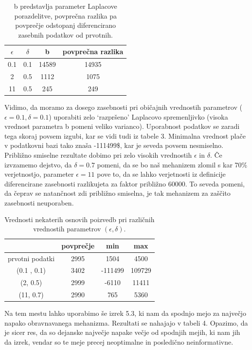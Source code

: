 \documentclass[12pt,a4paper]{amsart}
\theoremstyle{definition} %
\theoremstyle{plain} %
\begin{document}
\begin{table}[h]
\begin{center}
 \begin{tabular}{| c | c | c | c |} 
 \hline
 \textbf{$\epsilon$} & \textbf{$\delta$} & b & povprečna razlika  \\ [0.5ex] 
 \hline
 0.1 & 0.1 & 14589 & 14935  \\ 
 \hline
 2 & 0.5 & 1112 & 1075\\
 \hline
 11 & 0.5 & 245 & 249 \\
 \hline
\end{tabular}
\caption{b predstavlja parameter Laplacove porazdelitve, povprečna razlika pa povprečje odstopanj diferencirano zasebnih podatkov od prvotnih. }
\end{center}
\end{table}
Vidimo, da moramo za dosego zasebnosti pri običajnih vrednostih parametrov ($\epsilon = 0.1, \delta = 0.1$) uporabiti zelo `razpršeno' Laplacovo spremenljivko (visoka vrednost parametra b pomeni veliko varianco). Uporabnost podatkov se zaradi tega skoraj povsem izgubi, kar se vidi tudi iz tabele 3. Minimalna vrednost plače v podatkovni bazi tako znaša -111499\$, kar je seveda povsem nesmiselno. Približno smiselne rezultate dobimo pri zelo visokih vrednostih $\epsilon$ in $\delta$. Če izvzamemo dejstvo, da $\delta = 0.7$ pomeni, da se bo naš mehanizem zlomil s kar 70\% verjetnostjo, parameter $\epsilon = 11$ pove to, da se lahko verjetnosti iz definicije diferencirane zasebnosti razlikujeta za faktor približno 60000. To seveda pomeni, da čeprav se natančnost zdi približno smiselna, je tak mehanizem za zaščito zasebnosti neuporaben.
\begin{table}[h]
\begin{center}
 \begin{tabular}{| c | c | c | c |} 
 \hline
 & povprečje & min & max  \\ [0.5ex] 
 \hline
 prvotni podatki & 2995 & 1504 & 4500  \\ 
 \hline
 (0.1 , 0.1) & 3402 & -111499 & 109729\\
 \hline
 (2, 0.5) & 2999 & -6110 & 11411 \\
 \hline
 (11, 0.7) & 2990 & 765 & 5360 \\
 \hline
\end{tabular}
\caption{Vrednosti nekaterih osnovih poizvedb pri različnih vrednostih parametrov $(\epsilon, \delta)$. }
\end{center}
\end{table}
Na tem mestu lahko uporabimo še izrek 5.3, ki nam da spodnjo mejo za največjo napako obravnavanega mehanizma. Rezultati se nahajajo v tabeli 4. Opazimo, da je sicer res, da so dejanske največje napake večje od spodnjih mejih, ki nam jih da izrek, vendar so te meje precej neoptimalne in posledično neinformativne.
\end{document}
